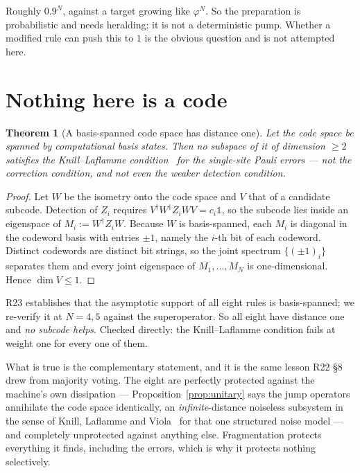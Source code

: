 \documentclass[11pt]{article}
\theoremstyle{plain}
\newtheorem{theorem}{Theorem}
\theoremstyle{remark}
\begin{document}
\noindent Roughly $0.9^N$, against a target growing like $\varphi^N$. So the
preparation is probabilistic and needs heralding; it is not a deterministic
pump. Whether a modified rule can push this to $1$ is the obvious question and
is not attempted here.

\section{Nothing here is a code}
\label{sec:code}

\begin{theorem}[A basis-spanned code space has distance one]
\label{thm:distance}
Let the code space be spanned by computational basis states. Then no subspace of
it of dimension $\ge 2$ satisfies the Knill--Laflamme condition~\cite{kl1997}
for the single-site Pauli errors --- not the correction condition, and not even
the weaker detection condition.
\end{theorem}

\begin{proof}
Let $W$ be the isometry onto the code space and $V$ that of a candidate
subcode. Detection of $Z_i$ requires $V^\dagger W^\dagger Z_i W V = c_i
\mathbb{1}$, so the subcode lies inside an eigenspace of $M_i := W^\dagger Z_i
W$. Because $W$ is basis-spanned, each $M_i$ is diagonal in the codeword basis
with entries $\pm 1$, namely the $i$-th bit of each codeword. Distinct codewords
are distinct bit strings, so the joint spectrum $\{(\pm1)_i\}$ separates them
and every joint eigenspace of $M_1,\dots,M_N$ is one-dimensional. Hence
$\dim V \le 1$.
\end{proof}

R23 establishes that the asymptotic support of all eight rules is basis-spanned;
we re-verify it at $N = 4, 5$ against the superoperator. So all eight have
distance one and \emph{no subcode helps}. Checked directly: the Knill--Laflamme
condition fails at weight one for every one of them.

What is true is the complementary statement, and it is the same lesson R22 \S8
drew from majority voting. The eight are perfectly protected against the
machine's own dissipation --- Proposition~\ref{prop:unitary} says the jump
operators annihilate the code space identically, an \emph{infinite}-distance
noiseless subsystem in the sense of Knill, Laflamme and Viola~\cite{klv2000} for
that one structured noise model --- and completely unprotected against anything
else. Fragmentation protects everything it finds, including the errors, which is
why it protects nothing selectively.
\end{document}
